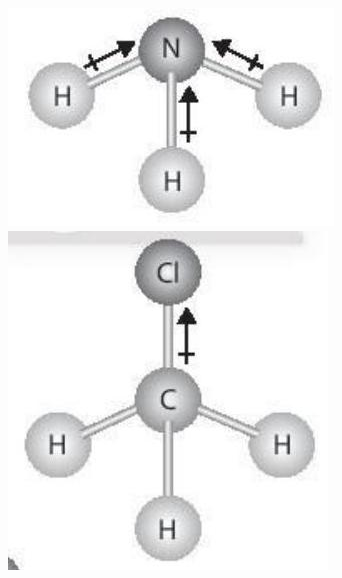 \documentclass[10pt]{article}
\begin{document}
\includegraphics[max width=\textwidth, center]{2025_10_23_57761e23b8c46a11c3efg-27(4)}\\
\includegraphics[max width=\textwidth, center]{2025_10_23_57761e23b8c46a11c3efg-27(2)}\\
\end{document}
